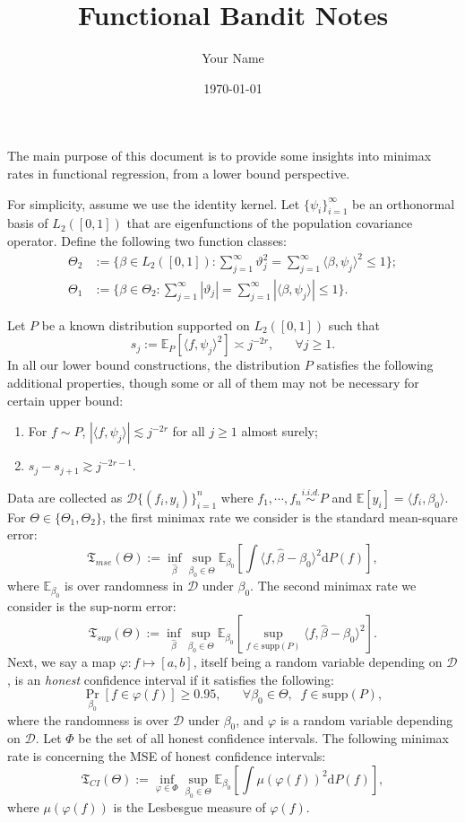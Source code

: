 \documentclass[11pt,a4paper]{article}
\title{Functional Bandit Notes}
\author{Your Name}
\date{\today}
\renewcommand{\hat}{\widehat}
\theoremstyle{definition}
\theoremstyle{plain}
\theoremstyle{remark}
\newcommand{\ud}{\mathrm d}
\begin{document}
The main purpose of this document is to provide some insights into minimax rates in functional regression, from a lower bound perspective.

For simplicity, assume we use the identity kernel. Let $\{\psi_i\}_{i=1}^{\infty}$ be an orthonormal basis of $L_2([0,1])$ that are eigenfunctions of the population covariance operator.
Define the following two function classes:
\begin{align*}
\textstyle
\Theta_2 &:= \{\beta\in L_2([0,1]): \sum_{j=1}^{\infty}\vartheta_j^2 =\sum_{j=1}^{\infty}\langle \beta,\psi_j\rangle^2\leq 1\};\\
\Theta_1 &:= \{\beta\in\Theta_2: \sum_{j=1}^{\infty}|\vartheta_j| = \sum_{j=1}^{\infty}|\langle\beta,\psi_j\rangle| \leq 1\}.
\end{align*}

Let $P$ be a known distribution supported on $L_2([0,1])$ such that
$$
s_j := \mathbb E_P[\langle f,\psi_j\rangle^2] \asymp j^{-2r},\;\;\;\;\;\;\forall j\geq 1.
$$
In all our lower bound constructions, the distribution $P$ satisfies the following additional properties, though some or all of them may not be necessary for certain upper bound:
\begin{enumerate}
\item For $f\sim P$, $|\langle f,\psi_j\rangle| \lesssim j^{-2r}$ for all $j\geq 1$ almost surely;
\item $s_j-s_{j+1}\gtrsim j^{-2r-1}$.
\end{enumerate}

Data are collected as $\mathcal D\{(f_i,y_i)\}_{i=1}^n$ where $f_1,\cdots,f_n\overset{i.i.d.}{\sim} P$ and $\mathbb E[y_i]=\langle f_i,\beta_0\rangle$.
For $\Theta\in\{\Theta_1,\Theta_2\}$, 
the first minimax rate we consider is the standard mean-square error:
$$
\mathfrak T_{mse}(\Theta) := \inf_{\hat\beta}\sup_{\beta_0\in\Theta} \mathbb E_{\beta_0}\left[\int \langle f,\hat\beta-\beta_0\rangle^2\ud P(f)\right],
$$
where $\mathbb E_{\beta_0}$ is over randomness in $\mathcal D$ under $\beta_0$.
The second minimax rate we consider is the sup-norm error:
$$
\mathfrak T_{sup}(\Theta) := \inf_{\hat\beta}\sup_{\beta_0\in\Theta}\mathbb E_{\beta_0}\left[\sup_{f\in\mathrm{supp}(P)}\langle f,\hat\beta-\beta_0\rangle^2\right].
$$
Next, we say a map $\varphi:f\mapsto [a,b]$, itself being a random variable depending on $\mathcal D$, is an \emph{honest} confidence interval if it satisfies the following:
$$
\Pr_{\beta_0}\left[f\in \varphi(f)\right] \geq 0.95,\;\;\;\;\;\;\forall\beta_0\in\Theta,\;\;f\in\mathrm{supp}(P),
$$
where the randomness is over $\mathcal D$ under $\beta_0$, and $\varphi$ is a random variable depending on $\mathcal D$.
Let $\Phi$ be the set of all honest confidence intervals. 
The following minimax rate is concerning the MSE of honest confidence intervals:
$$
\mathfrak T_{CI}(\Theta) := \inf_{\varphi\in\Phi}\sup_{\beta_0\in\Theta}\mathbb E_{\beta_0}\left[\int \mu(\varphi(f))^2\ud P(f)\right],
$$
where $\mu(\varphi(f))$ is the Lesbesgue measure of $\varphi(f)$.
\end{document}

